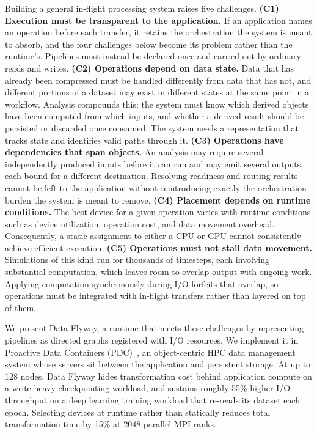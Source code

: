 Building a general in-flight processing system raises five challenges. \textbf{(C1) Execution must be transparent to the application.} If an application names an operation before each transfer, it retains the orchestration the system is meant to absorb, and the four challenges below become its problem rather than the runtime's. Pipelines must instead be declared once and carried out by ordinary reads and writes. \textbf{(C2) Operations depend on data state.} Data that has already been compressed must be handled differently from data that has not, and different portions of a dataset may exist in different states at the same point in a workflow. Analysis compounds this: the system must know which derived objects have been computed from which inputs, and whether a derived result should be persisted or discarded once consumed. The system needs a representation that tracks state and identifies valid paths through it. \textbf{(C3) Operations have dependencies that span objects.} An analysis may require several independently produced inputs before it can run and may emit several outputs, each bound for a different destination. Resolving readiness and routing results cannot be left to the application without reintroducing exactly the orchestration burden the system is meant to remove. \textbf{(C4) Placement depends on runtime conditions.} The best device for a given operation varies with runtime conditions such as device utilization, operation cost, and data movement overhead. Consequently, a static assignment to either a CPU or GPU cannot consistently achieve efficient execution. \textbf{(C5) Operations must not stall data movement.} Simulations of this kind run for thousands of timesteps, each involving substantial computation, which leaves room to overlap output with ongoing work. Applying computation synchronously during I/O forfeits that overlap, so operations must be integrated with in-flight transfers rather than layered on top of them.

We present Data Flyway, a runtime that meets these challenges by representing pipelines as directed graphs registered with I/O resources. We implement it in Proactive Data Containers (PDC)~\cite{tang2018toward, pdcdocs}, an object-centric HPC data management system whose servers sit between the application and persistent storage. At up to 128 nodes, Data Flyway hides transformation cost behind application compute on a write-heavy checkpointing workload, and sustains roughly 55\% higher I/O throughput on a deep learning training workload that re-reads its dataset each epoch. Selecting devices at runtime rather than statically reduces total transformation time by 15\% at 2048 parallel MPI ranks.

